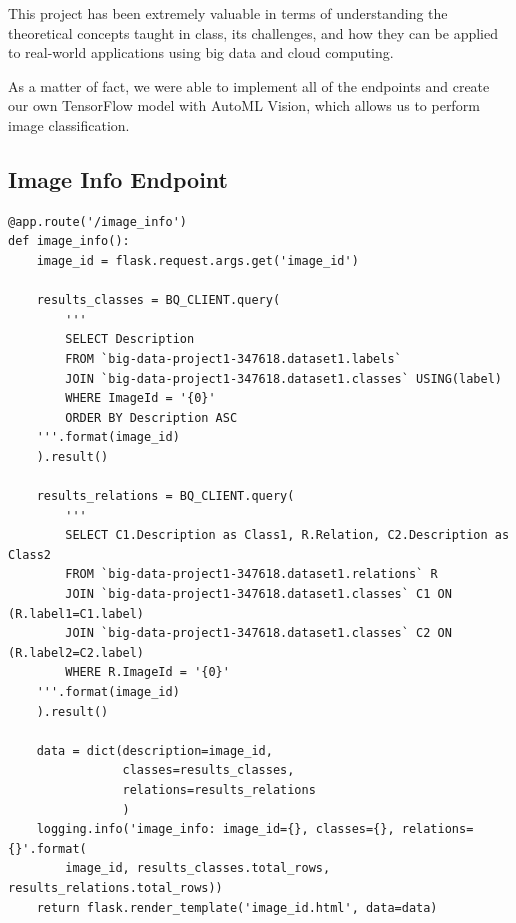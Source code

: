 \documentclass[a4paper, 11pt]{article}
\newenvironment{code}{\captionsetup{type=listing}}{}
\begin{document}
This project has been extremely valuable in terms of understanding the theoretical concepts taught 
in class, its challenges, and how they can be applied to real-world applications using big data and 
cloud computing.

As a matter of fact, we were able to implement all of the endpoints and create our own TensorFlow 
model
with AutoML Vision, which allows us to perform image classification.

\pagebreak

\begin{appendix}

\section{Image Info Endpoint}

\begin{code}
\begin{verbatim}
@app.route('/image_info')
def image_info():
    image_id = flask.request.args.get('image_id')

    results_classes = BQ_CLIENT.query(
        '''
        SELECT Description
        FROM `big-data-project1-347618.dataset1.labels`
        JOIN `big-data-project1-347618.dataset1.classes` USING(label)
        WHERE ImageId = '{0}'
        ORDER BY Description ASC
    '''.format(image_id)
    ).result()

    results_relations = BQ_CLIENT.query(
        '''
        SELECT C1.Description as Class1, R.Relation, C2.Description as Class2
        FROM `big-data-project1-347618.dataset1.relations` R
        JOIN `big-data-project1-347618.dataset1.classes` C1 ON (R.label1=C1.label)
        JOIN `big-data-project1-347618.dataset1.classes` C2 ON (R.label2=C2.label)
        WHERE R.ImageId = '{0}'
    '''.format(image_id)
    ).result()

    data = dict(description=image_id,
                classes=results_classes,
                relations=results_relations
                )
    logging.info('image_info: image_id={}, classes={}, relations={}'.format(
        image_id, results_classes.total_rows, results_relations.total_rows))
    return flask.render_template('image_id.html', data=data)

\end{verbatim}
\label{code:image_info}
\end{code}

\pagebreak


\end{appendix}
\end{document}
